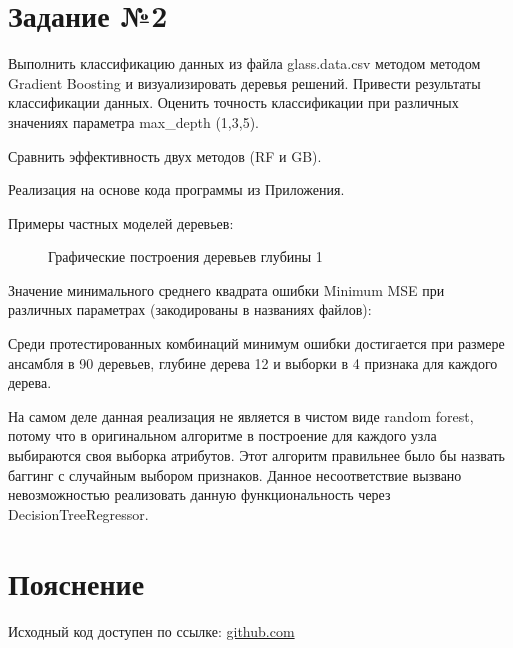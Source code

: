 \documentclass{article} %
\begin{document}
\clearpage
\section{Задание №2}
Выполнить классификацию данных из файла glass.data.csv
методом методом Gradient Boosting и визуализировать деревья решений.
Привести результаты классификации данных.
Оценить точность классификации при различных значениях параметра
max\_depth (1,3,5).

Сравнить эффективность двух методов (RF и GB).
\bigskip

Реализация на основе кода программы из Приложения.

\clearpage
Примеры частных моделей деревьев:

\begin{figure}[H]
	\centering
	\hfill
    \caption{Графические построения деревьев глубины 1}
\end{figure}
\bigskip

Значение минимального среднего квадрата ошибки Minimum MSE
при различных параметрах (закодированы в названиях файлов):


Среди протестированных комбинаций минимум ошибки достигается
при размере ансамбля в 90 деревьев,
глубине дерева 12 и выборки в 4 признака для каждого дерева.

На самом деле данная реализация
не является в чистом виде random forest,
потому что в оригинальном алгоритме
в построение для каждого узла выбираются
своя выборка атрибутов.
Этот алгоритм правильнее было бы назвать
баггинг с случайным выбором признаков.
Данное несоответствие вызвано
невозможностью реализовать данную функциональность
через DecisionTreeRegressor.

\section{Пояснение}
Исходный код доступен по ссылке:
\href{https://github.com/SvichkarevAnatoly/Course-Python-Bioinformatics/tree/master/semester2/task10}
{github.com}
\end{document}
